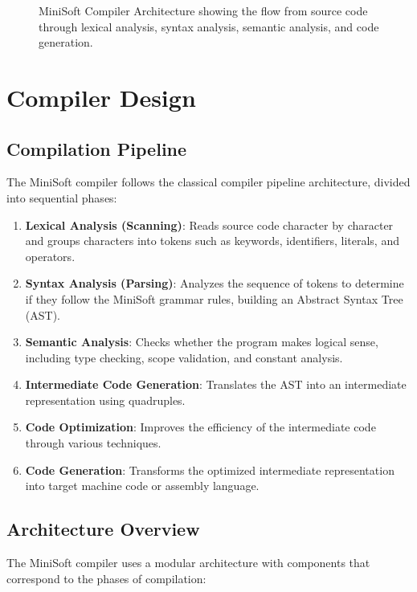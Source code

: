 \documentclass[12pt,a4paper]{article}
\begin{document}
\begin{figure}[H]
	\centering
	\caption{MiniSoft Compiler Architecture showing the flow from source code through lexical analysis, syntax analysis, semantic analysis, and code generation.}
	\label{fig:compiler-architecture}
\end{figure}

\section{Compiler Design}
\subsection{Compilation Pipeline}
The MiniSoft compiler follows the classical compiler pipeline architecture, divided into sequential phases:

\begin{enumerate}
	\item \textbf{Lexical Analysis (Scanning)}: Reads source code character by character and groups characters into tokens such as keywords, identifiers, literals, and operators.

	\item \textbf{Syntax Analysis (Parsing)}: Analyzes the sequence of tokens to determine if they follow the MiniSoft grammar rules, building an Abstract Syntax Tree (AST).

	\item \textbf{Semantic Analysis}: Checks whether the program makes logical sense, including type checking, scope validation, and constant analysis.

	\item \textbf{Intermediate Code Generation}: Translates the AST into an intermediate representation using quadruples.

	\item \textbf{Code Optimization}: Improves the efficiency of the intermediate code through various techniques.

	\item \textbf{Code Generation}: Transforms the optimized intermediate representation into target machine code or assembly language.
\end{enumerate}

\subsection{Architecture Overview}
The MiniSoft compiler uses a modular architecture with components that correspond to the phases of compilation:
\end{document}
